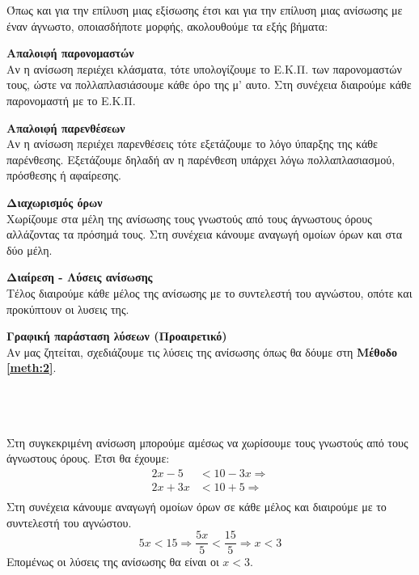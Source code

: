 \documentclass[twoside,nofonts,internet,methodoi]{thewria}
\begin{document}
\begin{Methodos}\label{meth:1}
Όπως και για την επίλυση μιας εξίσωσης έτσι και για την επίλυση μιας ανίσωσης με έναν άγνωστο, οποιασδήποτε μορφής, ακολουθούμε τα εξής βήματα:
\begin{bhma}
\item \textbf{Απαλοιφή παρονομαστών}\\
Αν η ανίσωση περιέχει κλάσματα, τότε υπολογίζουμε το Ε.Κ.Π. των παρονομαστών τους, ώστε να πολλαπλασιάσουμε κάθε όρο της μ' αυτο. Στη συνέχεια διαιρούμε κάθε παρονομαστή με το Ε.Κ.Π.
\item \textbf{Απαλοιφή παρενθέσεων}\\
Αν η ανίσωση περιέχει παρενθέσεις τότε εξετάζουμε το λόγο ύπαρξης της κάθε παρένθεσης. Εξετάζουμε δηλαδή αν η παρένθεση υπάρχει λόγω πολλαπλασιασμού, πρόσθεσης ή αφαίρεσης.
\item \textbf{Διαχωρισμός όρων}\\
Χωρίζουμε στα μέλη της ανίσωσης τους γνωστούς από τους άγνωστους όρους αλλάζοντας τα πρόσημά τους. Στη συνέχεια κάνουμε αναγωγή ομοίων όρων και στα δύο μέλη.
\item \textbf{Διαίρεση - Λύσεις ανίσωσης}\\
Τέλος διαιρούμε κάθε μέλος της ανίσωσης με το συντελεστή του αγνώστου, οπότε και προκύπτουν οι λυσεις της.
\item \textbf{Γραφική παράσταση λύσεων (Προαιρετικό)}\\
Αν μας ζητείται, σχεδιάζουμε τις λύσεις της ανίσωσης όπως θα δόυμε στη \textbf{Μέθοδο \ref{meth:2}}.
\end{bhma}
\end{Methodos}
\\\\
\lysh\\
Στη συγκεκριμένη ανίσωση μπορούμε αμέσως να χωρίσουμε τους γνωστούς από τους άγνωστους όρους. Έτσι θα έχουμε:
\begin{align*}
2x-5&<10-3x\Rightarrow\\
2x+3x&<10+5\Rightarrow\\
\end{align*}
Στη συνέχεια κάνουμε αναγωγή ομοίων όρων σε κάθε μέλος και διαιρούμε με το συντελεστή του αγνώστου.
\[ 5x<15\Rightarrow\frac{5x}{5}<\frac{15}{5}\Rightarrow x<3 \]
Επομένως οι λύσεις της ανίσωσης θα είναι οι $ x<3 $.\\\\
\end{document}
